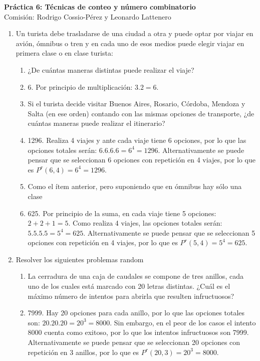 \documentclass[a4paper]{article}
\newcommand{\answer}{\item[**]}
\newcommand{\exercise}{\item}
\begin{document}
\noindent \hrulefill 
\vspace{-7pt}
\begin{center} 
	\textbf{ Práctica 6: Técnicas de conteo y número combinatorio} \\
	Comisión: Rodrigo Cossio-Pérez y Leonardo Lattenero
\end{center}
\vspace{-10pt}
\hrulefill


\begin{enumerate}

	\exercise Un turista debe trasladarse de una ciudad a otra y puede optar por viajar en avión, ómnibus o tren y en cada uno de esos medios puede elegir viajar en primera clase o en clase turista:
	\begin{enumerate} [label=(\alph*)]
		\item ¿De cuántas maneras distintas puede realizar el viaje?
		\answer 6. Por principio de multiplicación: $3 . 2 = 6$. 

		\item Si el turista decide visitar Buenos Aires, Rosario, Córdoba, Mendoza y Salta (en ese orden) contando con las mismas opciones de transporte, ¿de cuántas maneras puede realizar el itinerario?
		\answer 1296. Realiza 4 viajes y ante cada viaje tiene 6 opciones, por lo que las opciones totales serán: $6.6.6.6 = 6^4 = 1296$. Alternativamente se puede pensar que se seleccionan 6 opciones con repetición en 4 viajes, por lo que es $P^r(6,4)=6^4=1296$.
		
		\item Como el ítem anterior, pero suponiendo que en ómnibus hay sólo una clase
		\answer 625. Por principio de la suma, en cada viaje tiene 5 opciones: $ 2 + 2 + 1 = 5$. Como realiza 4 viajes, las opciones totales serán: $5.5.5.5 = 5^4 = 625$.  Alternativamente se puede pensar que se seleccionan 5 opciones con repetición en 4 viajes, por lo que es $P^r(5,4)=5^4=625$.
	\end{enumerate}

	\exercise Resolver los siguientes problemas random
	\begin{enumerate} [label=(\alph*)]
		\item La cerradura de una caja de caudales se compone de tres anillos, cada uno de los cuales está marcado con 20 letras distintas. ¿Cuál es el máximo número de intentos para abrirla que resulten infructuosos?
		\answer 7999. Hay 20 opciones para cada anillo, por lo que las opciones totales son: $20.20.20 = 20^3 = 8000$. Sin embargo, en el peor de los casos el intento 8000 cuenta como exitoso, por lo que los intentos infructuosos son 7999. Alternativamente se puede pensar que se seleccionan 20 opciones con repetición en 3 anillos, por lo que es $P^r(20,3)=20^3=8000$. 


\end{enumerate}
\end{enumerate}
\end{document}
